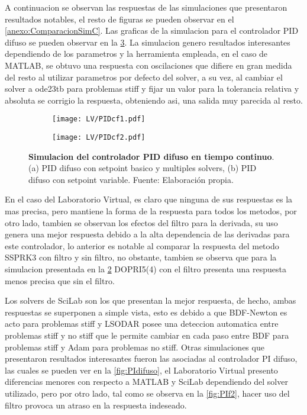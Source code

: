         A continuacion se observan las respuestas de las simulaciones que presentaron resultados notables, el resto de figuras se pueden observar en el \ref{anexo:ComparacionSimC}. Las graficas de la simulacion para el controlador PID difuso se pueden observar en la \cref{fig:PIDcf}. La simulacion genero resultados interesantes dependiendo de los parametros y la herramienta empleada, en el caso de MATLAB, se obtuvo una respuesta con oscilaciones que difiere en gran medida del resto al utilizar parametros por defecto del solver, a su vez, al cambiar el solver a ode23tb para problemas stiff y fijar un valor para la tolerancia relativa y absoluta se corrigio la respuesta, obteniendo asi, una salida muy parecida al resto.

        \begin{figure}[htb]
            \centering
            \begin{subfigure}[t]{0.49\textwidth}
                \centering
                \texttt{[image: LV/PIDcf1.pdf]}
                \caption{}
                \label{fig:PIDcf1}
            \end{subfigure}
            \hfill
            \begin{subfigure}[t]{0.49\textwidth}
                \centering
                \texttt{[image: LV/PIDcf2.pdf]}
                \caption{}
                \label{fig:PIDcf2}
            \end{subfigure}
            \caption[Simulacion del controlador PID difuso en tiempo continuo]{\textbf{Simulacion del controlador PID difuso en tiempo continuo}. (a) PID difuso con setpoint basico y multiples solvers, (b) PID difuso con setpoint variable. Fuente: Elaboración propia. \label{fig:PIDcf}}
        \end{figure}

        En el caso del Laboratorio Virtual, es claro que ninguna de sus respuestas es la mas precisa, pero mantiene la forma de la respuesta para todos los metodos, por otro lado, tambien se observan los efectos del filtro para la derivada, su uso genera una mejor respuesta debido a la alta dependencia de las derivadas para este controlador, lo anterior es notable al comparar la respuesta del metodo SSPRK3 con filtro y sin filtro, no obstante, tambien se observa que para la simulacion presentada en la \cref{fig:PIDcf2} DOPRI5(4) con el filtro presenta una respuesta menos precisa que sin el filtro. 
        
        Los solvers de SciLab son los que presentan la mejor respuesta, de hecho, ambas respuestas se superponen a simple vista, esto es debido a que BDF-Newton es acto para problemas stiff y LSODAR posee una deteccion automatica entre problemas stiff y no stiff que le permite cambiar en cada paso entre BDF para problemas stiff y Adam para problemas no stiff. Otras simulaciones que presentaron resultados interesantes fueron las asociadas al controlador PI difuso, las cuales se pueden ver en la \cref{fig:PIdifuso}, el Laboratorio Virtual presento diferencias menores con respecto a MATLAB y SciLab dependiendo del solver utilizado, pero por otro lado, tal como se observa en la \cref{fig:PIf2}, hacer uso del filtro provoca un atraso en la respuesta indeseado. 

